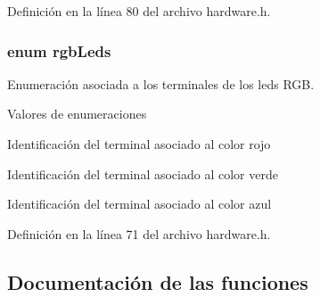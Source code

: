 Definición en la línea 80 del archivo hardware.\+h.

\subsubsection[{\texorpdfstring{rgb\+Leds}{rgbLeds}}]{\setlength{\rightskip}{0pt plus 5cm}enum {\bf rgb\+Leds}}\hypertarget{group__hardware_ga84e58e8cc8e3fe349be97bcd3221c360}{}\label{group__hardware_ga84e58e8cc8e3fe349be97bcd3221c360}


Enumeración asociada a los terminales de los leds R\+GB. 

\begin{Desc}
\item[Valores de enumeraciones]\par
\begin{description}
\item[{\em 
Led\+\_\+\+Rojo\hypertarget{group__hardware_gga84e58e8cc8e3fe349be97bcd3221c360a5662baf6795c7030ea75e47a0019a61d}{}\label{group__hardware_gga84e58e8cc8e3fe349be97bcd3221c360a5662baf6795c7030ea75e47a0019a61d}
}]Identificación del terminal asociado al color rojo \item[{\em 
Led\+\_\+\+Verde\hypertarget{group__hardware_gga84e58e8cc8e3fe349be97bcd3221c360aa5ad7834a37faf1e2620fa3db1838a21}{}\label{group__hardware_gga84e58e8cc8e3fe349be97bcd3221c360aa5ad7834a37faf1e2620fa3db1838a21}
}]Identificación del terminal asociado al color verde \item[{\em 
Led\+\_\+\+Azul\hypertarget{group__hardware_gga84e58e8cc8e3fe349be97bcd3221c360a90357fded550cd38cda43991725234cb}{}\label{group__hardware_gga84e58e8cc8e3fe349be97bcd3221c360a90357fded550cd38cda43991725234cb}
}]Identificación del terminal asociado al color azul \end{description}
\end{Desc}


Definición en la línea 71 del archivo hardware.\+h.



\subsection{Documentación de las funciones}
